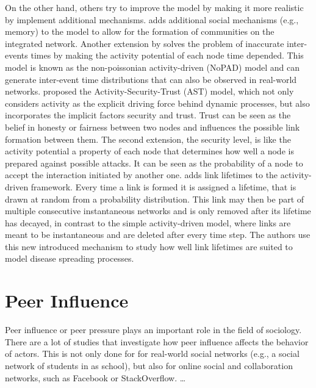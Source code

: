 On the other hand, others try to improve the model by making it more realistic by implement additional mechanisms.
\citet{Laurent2015} adds additional social mechanisms (e.g., memory) to the model to allow for the formation of communities on the integrated network.
Another extension by \citet{Moinet2015, Moinet2016} solves the problem of inaccurate inter-events times by making the activity potential of each node time depended.
This model is known as the non-poissonian activity-driven (NoPAD) model and can generate inter-event time distributions that can also be observed in real-world networks.
\citet{Wang2016} proposed the Activity-Security-Trust (AST) model, which not only considers activity as the explicit driving force behind dynamic processes, but also incorporates the implicit factors security and trust.
Trust can be seen as the belief in honesty or fairness between two nodes and influences the possible link formation between them.
The second extension, the security level, is like the activity potential a property of each node that determines how well a node is prepared against possible attacks.
It can be seen as the probability of a node to accept the interaction initiated by another one.
\citet{Sunny2015} adds link lifetimes to the activity-driven framework.
Every time a link is formed it is assigned a lifetime, that is drawn at random from a probability distribution.
This link may then be part of multiple consecutive instantaneous networks
and is only removed after its lifetime has decayed, in contrast to the simple activity-driven model, where links are meant to be instantaneous and are deleted after every time step.
The authors use this new introduced mechanism to study how well link lifetimes are suited to model disease spreading processes.




\section{Peer Influence}
\label{sec:peer-influence}

Peer influence or peer pressure plays an important role in the field of sociology.
There are a lot of studies that investigate how peer influence affects the behavior of actors.
This is not only done for for real-world social networks (e.g., a social network of students in  as school), but also for online social and collaboration networks, such as Facebook or StackOverflow. \ldots

